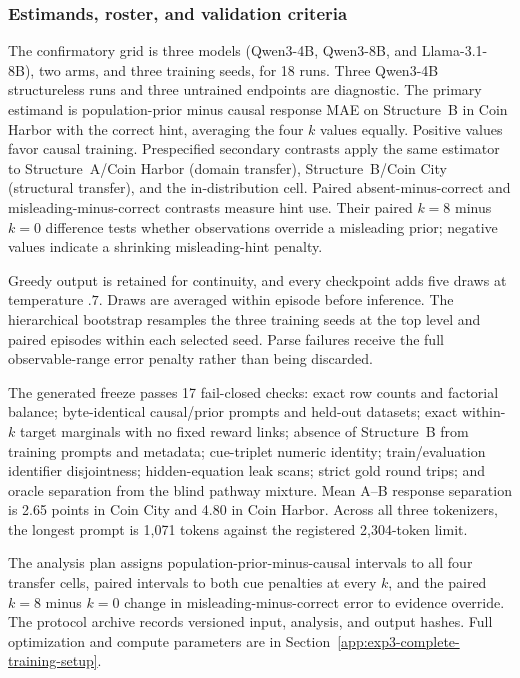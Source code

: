 \subsubsection{Estimands, roster, and validation criteria}

The confirmatory grid is three models (Qwen3-4B, Qwen3-8B, and
Llama-3.1-8B), two arms, and three training seeds, for 18 runs. Three
Qwen3-4B structureless runs and three untrained endpoints are diagnostic.
The primary estimand is population-prior minus causal response MAE on
Structure~B in Coin Harbor with the correct hint, averaging the four $k$ values
equally. Positive values favor causal training. Prespecified secondary contrasts
apply the same estimator to Structure~A/Coin Harbor (domain transfer),
Structure~B/Coin City (structural transfer), and the in-distribution cell.
Paired absent-minus-correct and misleading-minus-correct contrasts measure hint
use. Their paired $k=8$ minus $k=0$ difference tests whether observations override
a misleading prior; negative values indicate a shrinking misleading-hint penalty.

Greedy output is retained for continuity, and every checkpoint adds five draws at
temperature $.7$. Draws are averaged within episode before inference. The
hierarchical bootstrap resamples the three training seeds at the top level and
paired episodes within each selected seed. Parse failures receive the full
observable-range error penalty rather than being discarded.

The generated freeze passes 17 fail-closed checks: exact row counts and factorial
balance; byte-identical causal/prior prompts and held-out datasets; exact
within-$k$ target marginals with no fixed reward links; absence of Structure~B
from training prompts and metadata; cue-triplet numeric identity; train/evaluation
identifier disjointness; hidden-equation leak scans; strict gold round trips; and
oracle separation from the blind pathway mixture. Mean A--B response separation
is 2.65 points in Coin City and 4.80 in Coin Harbor. Across all three tokenizers,
the longest prompt is 1,071 tokens against the registered 2,304-token limit.

The analysis plan assigns population-prior-minus-causal intervals to all four
transfer cells, paired intervals to both cue penalties at every $k$, and the paired
$k=8$ minus $k=0$ change in misleading-minus-correct error to evidence override.
The protocol archive records versioned input, analysis, and output hashes. Full
optimization and compute parameters are in
Section~\ref{app:exp3-complete-training-setup}.

